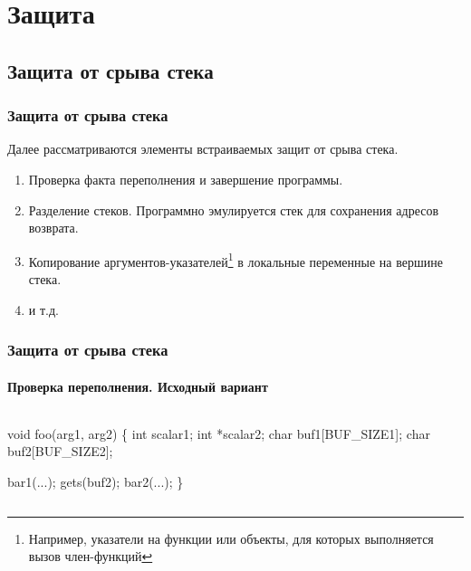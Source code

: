 \section{Защита}

\subsection{Защита от срыва стека}


\begin{frame}
    \frametitle{Защита от срыва стека}
    
    Далее рассматриваются элементы встраиваемых защит от срыва стека.
    \begin{enumerate}
        \item Проверка факта переполнения и завершение программы.
        \item Разделение стеков. Программно эмулируется стек для сохранения адресов возврата.
        \item Копирование аргументов-указателей\footnote{Например, указатели на функции или объекты, для которых выполняется вызов член-функций} в локальные переменные на вершине стека.
        \item и т.д.
    \end{enumerate}
\end{frame}


\begin{frame}[fragile]
    \frametitle{Защита от срыва стека}
    \framesubtitle{Проверка переполнения. Исходный вариант}

\begin{columns}
\begin{semiverbatim}
void foo(arg1, arg2) \{
    int   scalar1;
    int  *scalar2;
    char buf1[BUF_SIZE1];
    char buf2[BUF_SIZE2];

    bar1(...);
    \alert{gets(buf2)};
    bar2(...);
\}
\end{semiverbatim}
        \begin{block}{}
\begin{semiverbatim}
\end{semiverbatim}
        \end{block}
\end{columns}
\end{frame}


